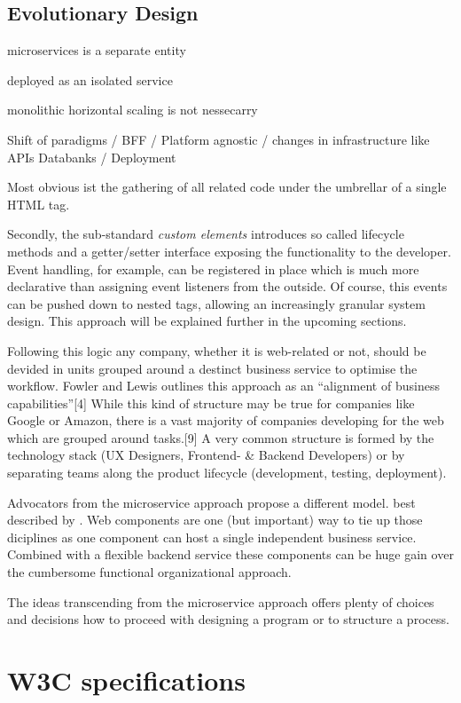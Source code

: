 \documentclass[]{assets/latex/ieee}
\begin{document}
\subsection{Evolutionary Design}\label{evolutionary-design}

microservices is a separate entity

deployed as an isolated service

monolithic horizontal scaling is not nessecarry

Shift of paradigms / BFF / Platform agnostic / changes in infrastructure
like APIs Databanks / Deployment

Most obvious ist the gathering of all related code under the umbrellar
of a single HTML tag.

Secondly, the sub-standard \emph{custom elements} introduces so called
lifecycle methods and a getter/setter interface exposing the
functionality to the developer. Event handling, for example, can be
registered in place which is much more declarative than assigning event
listeners from the outside. Of course, this events can be pushed down to
nested tags, allowing an increasingly granular system design. This
approach will be explained further in the upcoming sections.

Following this logic any company, whether it is web-related or not,
should be devided in units grouped around a destinct business service to
optimise the workflow. Fowler and Lewis outlines this approach as an
``alignment of business capabilities''{[}4{]} While this kind of
structure may be true for companies like Google or Amazon, there is a
vast majority of companies developing for the web which are grouped
around tasks.{[}9{]} A very common structure is formed by the technology
stack (UX Designers, Frontend- \& Backend Developers) or by separating
teams along the product lifecycle (development, testing, deployment).

Advocators from the microservice approach propose a different model.
best described by . Web components are one (but important) way to tie up
those diciplines as one component can host a single independent business
service. Combined with a flexible backend service these components can
be huge gain over the cumbersome functional organizational approach.

The ideas transcending from the microservice approach offers plenty of
choices and decisions how to proceed with designing a program or to
structure a process.

\section{W3C specifications}\label{w3c-specifications}
\end{document}

